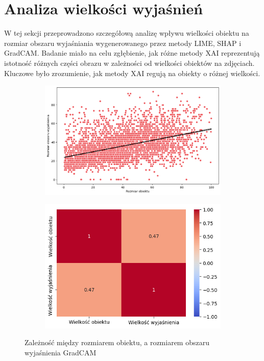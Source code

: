 \section*{Analiza wielkości wyjaśnień}

W tej sekcji przeprowadzono szczegółową analizę wpływu wielkości obiektu na rozmiar obszaru wyjaśniania wygenerowanego przez metody LIME, SHAP i GradCAM.
Badanie miało na celu zgłębienie, jak różne metody XAI reprezentują istotność różnych części obrazu w zależności od wielkości obiektów na zdjęciach.
Kluczowe było zrozumienie, jak metody XAI regują na obiekty o różnej wielkości.

\begin{figure}[h]
	\centering
	\begin{subfigure}[b]{0.45\textwidth}
		\includegraphics[width=.9\textwidth]{img/size_exp_gradcam}
	\end{subfigure}
	\begin{subfigure}[b]{0.45\textwidth}
		\includegraphics[width=.9\textwidth]{img/size_exp_gradcam_corr}
	\end{subfigure}
	\caption{Zależność między rozmiarem obiektu, a rozmiarem obszaru wyjaśnienia GradCAM}
	\label{rys:size_exp_gradcam}
\end{figure}

